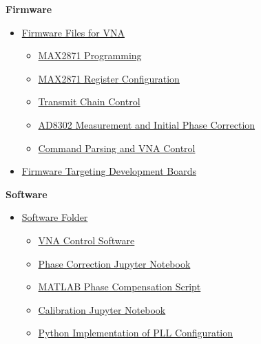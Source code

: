 \textbf{Firmware}
\begin{itemize}
	\item \href{https://github.com/joshajohnson/vna/tree/master/Firmware/VNA}{Firmware Files for VNA} 
	\begin{itemize}
		\item \href{https://github.com/joshajohnson/vna/blob/master/Firmware/VNA/Src/max2871.c}{MAX2871 Programming}
		\item
		\href{https://github.com/joshajohnson/vna/blob/master/Firmware/VNA/Src/max2871_registers.c}{MAX2871 Register Configuration}
		\item
		\href{https://github.com/joshajohnson/vna/blob/master/Firmware/VNA/Src/txChain.c}{Transmit Chain Control}
		\item
		\href{https://github.com/joshajohnson/vna/blob/master/Firmware/VNA/Src/receiver.c}{AD8302 Measurement and Initial Phase Correction}
		\item
		\href{https://github.com/joshajohnson/vna/blob/master/Firmware/VNA/Src/commandParser.c}{Command Parsing and VNA Control}
	\end{itemize}
	\item \href{https://github.com/joshajohnson/vna/tree/master/Firmware/DevBoards}{Firmware Targeting Development Boards}\\
\end{itemize}


\textbf{Software}
\begin{itemize}
	\item \href{https://github.com/joshajohnson/vna/tree/master/Software/vna}{Software Folder}
	\begin{itemize}
		\item \href{https://github.com/joshajohnson/vna/blob/master/Software/vna/vna.py}{VNA Control Software}
		\item \href{https://github.com/joshajohnson/vna/blob/master/Software/vna/phase_correction.ipynb}{Phase Correction Jupyter Notebook}
		\item \href{https://github.com/joshajohnson/vna/blob/master/Software/justTesting/ad8302Cal.m}{MATLAB Phase Compensation Script}
		\item \href{https://github.com/joshajohnson/vna/blob/master/Software/vna/calibration.ipynb}{Calibration Jupyter Notebook}
		\item \href{https://github.com/joshajohnson/vna/blob/master/Firmware/DevBoards/freqGen.py}{Python Implementation of PLL Configuration}
	\end{itemize}
\end{itemize}




